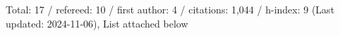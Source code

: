 Total: 17 / refereed: 10 / first author: 4 / citations: 1,044 / h-index: 9 (Last updated: 2024-11-06), List attached below